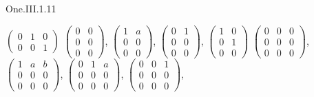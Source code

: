 \begin{ans}{One.III.1.11}
\begin{exparts}
          $\begin{pmatrix}
               0  &1  &0  \\
               0  &0  &1
             \end{pmatrix}$
        \partsitem
          $\begin{pmatrix}
               0  &0  \\
               0  &0  \\
               0  &0
             \end{pmatrix}$,
          $\begin{pmatrix}
               1  &a  \\
               0  &0  \\
               0  &0
             \end{pmatrix}$,
          $\begin{pmatrix}
               0  &1  \\
               0  &0  \\
               0  &0
             \end{pmatrix}$,
          $\begin{pmatrix}
               1  &0  \\
               0  &1  \\
               0  &0
             \end{pmatrix}$
        \partsitem
          $\begin{pmatrix}
               0  &0  &0  \\
               0  &0  &0  \\
               0  &0  &0
             \end{pmatrix}$,
          $\begin{pmatrix}
               1  &a  &b  \\
               0  &0  &0  \\
               0  &0  &0
             \end{pmatrix}$,
          $\begin{pmatrix}
               0  &1  &a  \\
               0  &0  &0  \\
               0  &0  &0
             \end{pmatrix}$,
          $\begin{pmatrix}
               0  &0  &1  \\
               0  &0  &0  \\
               0  &0  &0
             \end{pmatrix}$,

\end{exparts}
\end{ans}
